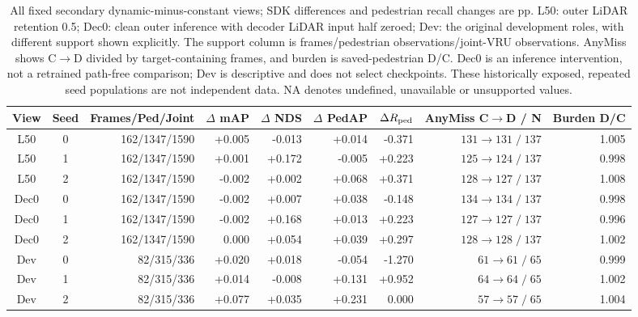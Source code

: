 \begin{table}[t]
\centering
\footnotesize
\setlength{\tabcolsep}{3.5pt}
\caption{All fixed secondary dynamic-minus-constant views; SDK differences and pedestrian recall changes are pp. L50: outer LiDAR retention 0.5; Dec0: clean outer inference with decoder LiDAR input half zeroed; Dev: the original development roles, with different support shown explicitly. The support column is frames/pedestrian observations/joint-VRU observations. AnyMiss shows C$\to$D divided by target-containing frames, and burden is saved-pedestrian D/C. Dec0 is an inference intervention, not a retrained path-free comparison; Dev is descriptive and does not select checkpoints. These historically exposed, repeated seed populations are not independent data. NA denotes undefined, unavailable or unsupported values.}
\label{tab:new_secondary}
\begin{tabular}{ccrrrrrrr}
\toprule
View & Seed & Frames/Ped/Joint & $\Delta$ mAP & $\Delta$ NDS & $\Delta$ PedAP & $\Delta R_{\rm ped}$ & AnyMiss C$\to$D / N & Burden D/C \\
\midrule
L50 & 0 & 162/1347/1590 & +0.005 & -0.013 & +0.014 & -0.371 & $131\!\to\!131\;/\;137$ & 1.005 \\
L50 & 1 & 162/1347/1590 & +0.001 & +0.172 & -0.005 & +0.223 & $125\!\to\!124\;/\;137$ & 0.998 \\
L50 & 2 & 162/1347/1590 & -0.002 & +0.002 & +0.068 & +0.371 & $128\!\to\!127\;/\;137$ & 1.008 \\
Dec0 & 0 & 162/1347/1590 & -0.002 & +0.007 & +0.038 & -0.148 & $134\!\to\!134\;/\;137$ & 0.998 \\
Dec0 & 1 & 162/1347/1590 & -0.002 & +0.168 & +0.013 & +0.223 & $127\!\to\!127\;/\;137$ & 0.996 \\
Dec0 & 2 & 162/1347/1590 & 0.000 & +0.054 & +0.039 & +0.297 & $128\!\to\!128\;/\;137$ & 1.002 \\
Dev & 0 & 82/315/336 & +0.020 & +0.018 & -0.054 & -1.270 & $61\!\to\!61\;/\;65$ & 0.999 \\
Dev & 1 & 82/315/336 & +0.014 & -0.008 & +0.131 & +0.952 & $64\!\to\!64\;/\;65$ & 1.002 \\
Dev & 2 & 82/315/336 & +0.077 & +0.035 & +0.231 & 0.000 & $57\!\to\!57\;/\;65$ & 1.004 \\
\bottomrule
\end{tabular}
\end{table}
